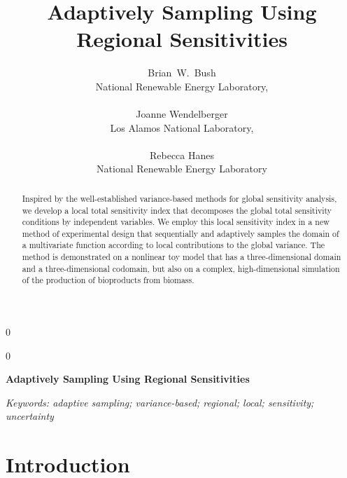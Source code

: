 \documentclass[12pt]{article}
\newcommand{\blind}{0}
\begin{document}
%

\def\spacingset#1{\renewcommand{\baselinestretch}%
{#1}\small\normalsize} \spacingset{1}



\blind
{
  \title{\bf Adaptively Sampling Using Regional Sensitivities}
  \author{
    Brian\ W.\ Bush \\
    National Renewable Energy Laboratory, \\ \\
    Joanne Wendelberger \\
    Los Alamos National Laboratory, \\ \\
    Rebecca Hanes \\
    National Renewable Energy Laboratory
  }
  \maketitle
} \fi

\blind
{
  \bigskip
  \bigskip
  \bigskip
  \begin{center}
    {\LARGE\bf Adaptively Sampling Using Regional Sensitivities}
\end{center}
  \medskip
} \fi

\bigskip
\begin{abstract}
Inspired by the well-established variance-based methods for global sensitivity analysis, we develop a local total sensitivity index that decomposes the global total sensitivity conditions by independent variables. We employ this local sensitivity index in a new method of experimental design that sequentially and adaptively samples the domain of a multivariate function according to local contributions to the global variance. The method is demonstrated on a nonlinear toy model that has a three-dimensional domain and a three-dimensional codomain, but also on a complex, high-dimensional simulation of the production of bioproducts from biomass. 
\end{abstract}

\noindent%
{\it Keywords: adaptive sampling; variance-based; regional; local; sensitivity; uncertainty} 
\vfill

\newpage


\section{Introduction}
\end{document}
